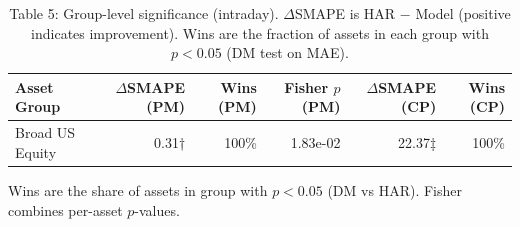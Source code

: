 \begin{table}[t]
\centering
\caption{Table 5: Group-level significance (intraday). $\Delta$SMAPE is HAR $-$ Model (positive indicates improvement). Wins are the fraction of assets in each group with $p<0.05$ (DM test on MAE).}
\label{tab:groups}
\begin{tabular}{l r r r r r}
\toprule
Asset Group & $\Delta$SMAPE (PM) & Wins (PM) & Fisher $p$ (PM) & $\Delta$SMAPE (CP) & Wins (CP) \\
\midrule
Broad US Equity & 0.31† & 100\% & 1.83e-02 & 22.37‡ & 100\% \\
\bottomrule
\end{tabular}
\vspace{2pt}
\footnotesize{Wins are the share of assets in group with $p<0.05$ (DM vs HAR). Fisher combines per-asset $p$-values.}
\end{table}
